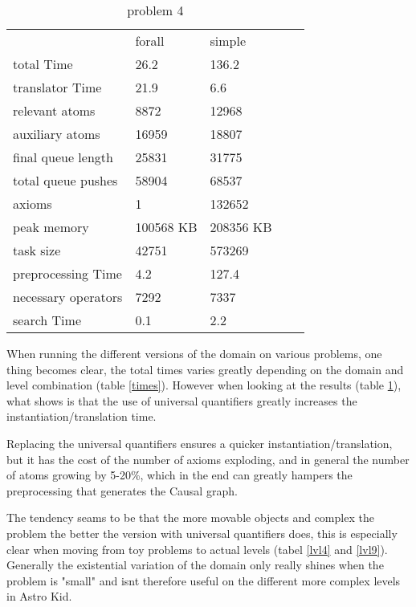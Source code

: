 			\begin{table}[h]
				\centering
				\caption{problem 4}
				\label{prob4}
				\begin{tabular}{lllll}
					& forall & simple  \\
					total Time & 26.2 & 136.2 \\
					translator Time& 21.9 & 6.6 \\
					
					
					relevant atoms & 8872 & 12968\\
					auxiliary atoms & 16959& 18807\\
					final queue length &25831 & 31775\\
					total queue pushes &58904 & 68537\\
					axioms & 1 & 132652 \\ 
					peak memory & 100568 KB & 208356 KB\\ 
					task size & 42751 & 573269\\
					
					
					preprocessing Time& 4.2 & 127.4 \\
					necessary operators & 7292 & 7337\\
					
					
					search Time & 0.1 & 2.2 \\
				\end{tabular}
			\end{table}
			When running the different versions of the domain on various problems, one thing becomes clear, the total times varies greatly depending on the domain and level combination (table \ref{times}). However when looking at the results (table \ref{prob4}), what shows is that the use of universal quantifiers greatly increases the instantiation/translation time. 
			
			Replacing the universal quantifiers ensures a quicker instantiation/translation, but it has the cost of the number of axioms exploding, and in general the number of atoms growing by 5-20\%, which in the end can greatly hampers the preprocessing that generates the Causal graph.
			
			The tendency seams to be that the more movable objects and complex the problem the better the version with universal quantifiers does, this is especially clear when moving from toy problems to actual levels (tabel \ref{lvl4} and \ref{lvl9}). Generally the existential variation of the domain only really shines when the problem is "small" and isnt therefore useful on the different more complex levels in Astro Kid.
			
